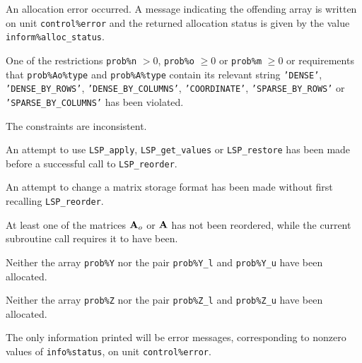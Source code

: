 \documentclass{galahad}
\newcommand{\packagename}{LSP}
\begin{document}
\begin{description}

 An allocation error occurred.
A message indicating the offending
 array is written on unit {\tt control\%error} and the returned allocation
 status is given by the value {\tt inform\%alloc\_status}.

 One of the restrictions
{\tt prob\%n} $> 0$, {\tt prob\%o} $\geq  0$ or {\tt prob\%m} $\geq  0$
    or requirements that {\tt prob\%Ao\%type}
    and {\tt prob\%A\%type} contain its relevant string
    {\tt 'DENSE'}, {\tt 'DENSE\_BY\_ROWS'}, {\tt 'DENSE\_BY\_COLUMNS'},
   {\tt 'COORDINATE'}, {\tt 'SPARSE\_BY\_ROWS'} or {\tt 'SPARSE\_BY\_COLUMNS'}
    has been violated.


 The constraints are inconsistent.

 An attempt to use
{\tt \packagename\_apply}, {\tt \packagename\_get\_values}
or {\tt \packagename\_restore}
has been made before a successful call to {\tt \packagename\_reorder}.

 An attempt to change a matrix storage format has been made
without first recalling {\tt \packagename\_reorder}.

 At least one of the matrices ${\mathbf{A}}_o$ or ${\mathbf{A}}$ has not been reordered,
while the current subroutine call requires it to have been.

 Neither the array {\tt prob\%Y} nor the pair {\tt prob\%Y\_l} and
{\tt prob\%Y\_u} have been allocated.

 Neither the array {\tt prob\%Z} nor the pair {\tt prob\%Z\_l} and
{\tt prob\%Z\_u} have been allocated.

\end{description}


\galinfo
The only information printed will be error messages, corresponding to
nonzero values of {\tt info\%status}, on unit {\tt control\%error}.

\end{document}
